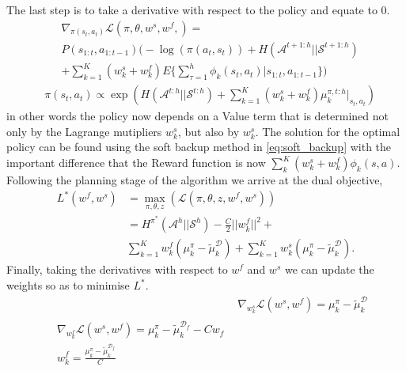 \documentclass[letterpaper]{article}
\begin{document}
The last step is to take a derivative with respect to the policy and equate to 0.
\begin{equation}
 \begin{split}
 &\nabla_{\pi(s_t,a_t)}\mathcal{L}(\pi,\theta,w^s,w^f,) =\\
&P(s_{1:t},a_{1:t-1})\big(-\log(\pi(a_t,s_t))+ H(\mathcal{A}^{t+1:h}||\mathcal{S}^{t+1:h})\\
& +\sum\nolimits_{k=1}^K (w^s_k+ w^f_k)E\big\{\sum\nolimits_{\tau=1}^h \phi_k(s_t,a_t)|s_{1:t},a_{1:t-1}\big\}\big) \label{eqn:lagragian_derivative_failure}
 \end{split}
\end{equation}
\begin{equation}
\label{eq:policy_prop}
	\begin{split}
	&\pi(s_t,a_t) \propto \exp\left(H(\mathcal{A}^{t:h}||\mathcal{S}^{t:h})+\sum^K_{k=1}(w^s_k + w^f_k)\mu_k^{\pi,t:h}|_{s_t,a_t}\right)
	\end{split}
\end{equation}
in other words the policy now depends on a Value term that is determined not only by the Lagrange mutipliers $w^s_k$, but also by $w^s_k$.
The solution for the optimal policy can be found using the soft backup method in \eqref{eq:soft_backup}
with the important difference that the Reward function is now $\sum_k^K(w^s_k + w^f_k)\phi_k(s,a)$.
Following the planning stage of the algorithm we arrive at the dual objective,
\begin{equation}
	\begin{split}
	L^*(w^f,w^s) &=\max_{\pi,\theta,z}\left(\mathcal{L}(\pi,\theta,z,w^f,w^s)\right)\\
				  &= H^{\pi^*}(\mathcal{A}^h||\mathcal{S}^h) - \frac{C}{2}||w^f_k||^2 +\\ 
				&\sum_{k=1}^Kw^f_k (\mu^{\pi}_k -\widetilde{\mu}^{\mathcal{D}}_k) + \sum_{k=1}^Kw^s_k(\mu^{\pi}_k-\widetilde{\mu}^{\mathcal{D}}_k).
	\end{split}
	\label{eq:partial_objective_failure}
\end{equation}
Finally, taking the derivatives with respect to $w^f$ and $w^s$ we can update the weights so as to minimise $L^*$.
\begin{align}
	&\nabla_{w^s_k}\mathcal{L}(w^s,w^f) = \mu^{\pi}_k - \widetilde{\mu}^{\mathcal{D}}_k \label{eq:update_success}\\
	\begin{split}
		&\nabla_{w^f_k}\mathcal{L}(w^s,w^f) = \mu^{\pi}_k - \widetilde{\mu}^{\mathcal{D}_f}_k - Cw_f\\
		&w^f_k = \frac{\mu^{\pi}_k - \widetilde{\mu}^{\mathcal{D}_f}_k}{C} \label{eq:update_failure}
	\end{split}
\end{align}
\end{document}
